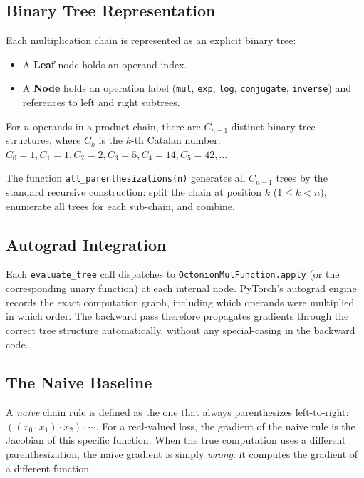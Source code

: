 \documentclass[11pt]{article}
\begin{document}
\subsection{Binary Tree Representation}

Each multiplication chain is represented as an explicit binary tree:
\begin{itemize}
  \item A \textbf{Leaf} node holds an operand index.
  \item A \textbf{Node} holds an operation label (\texttt{mul}, \texttt{exp},
        \texttt{log}, \texttt{conjugate}, \texttt{inverse}) and references to
        left and right subtrees.
\end{itemize}
For $n$ operands in a product chain, there are $C_{n-1}$ distinct binary tree
structures, where $C_k$ is the $k$-th Catalan number:
$C_0=1, C_1=1, C_2=2, C_3=5, C_4=14, C_5=42, \ldots$

The function \texttt{all\_parenthesizations(n)} generates all $C_{n-1}$ trees
by the standard recursive construction: split the chain at position $k$
($1 \le k < n$), enumerate all trees for each sub-chain, and combine.

\subsection{Autograd Integration}

Each \texttt{evaluate\_tree} call dispatches to \texttt{OctonionMulFunction.apply}
(or the corresponding unary function) at each internal node.  PyTorch's
autograd engine records the exact computation graph, including which operands
were multiplied in which order.  The backward pass therefore propagates
gradients through the correct tree structure automatically, without any
special-casing in the backward code.

\subsection{The Naive Baseline}

A \emph{naive} chain rule is defined as the one that always parenthesizes
left-to-right: $((x_0 \cdot x_1) \cdot x_2) \cdot \cdots$.  For a real-valued
loss, the gradient of the naive rule is the Jacobian of this specific function.
When the true computation uses a different parenthesization, the naive gradient
is simply \emph{wrong}: it computes the gradient of a different function.

\end{document}
